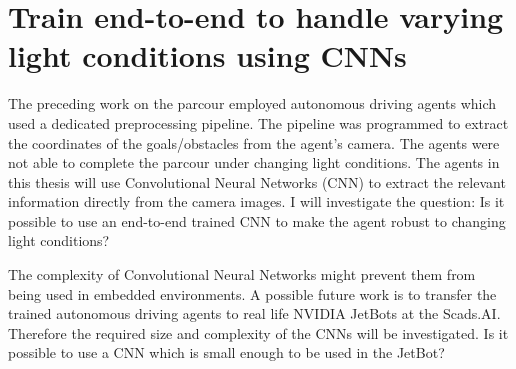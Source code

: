 \section*{Train end-to-end to handle varying light conditions using CNNs}

The preceding work on the parcour employed autonomous driving agents which used a dedicated preprocessing pipeline. The pipeline was programmed to extract the coordinates of the goals/obstacles from the agent's camera. The agents were not able to complete the parcour under changing light conditions. The agents in this thesis will use Convolutional Neural Networks (CNN) to extract the relevant information directly from the camera images. I will investigate the question: Is it possible to use an end-to-end trained CNN to make the agent robust to changing light conditions?

The complexity of Convolutional Neural Networks might prevent them from being used in embedded environments. A possible future work is to transfer the trained autonomous driving agents to real life NVIDIA JetBots at the Scads.AI. Therefore the required size and complexity of the CNNs will be investigated. Is it possible to use a CNN which is small enough to be used in the JetBot?


